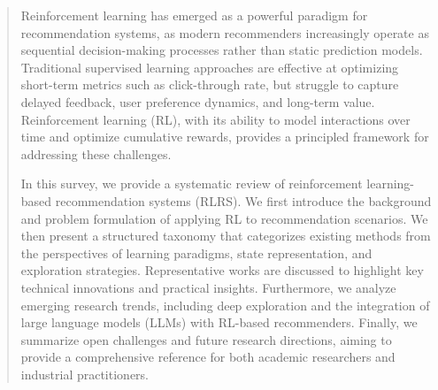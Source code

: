 \begin{abstract}

Reinforcement learning has emerged as a powerful paradigm for recommendation systems, as modern recommenders increasingly operate as sequential decision-making processes rather than static prediction models. Traditional supervised learning approaches are effective at optimizing short-term metrics such as click-through rate, but struggle to capture delayed feedback, user preference dynamics, and long-term value. Reinforcement learning (RL), with its ability to model interactions over time and optimize cumulative rewards, provides a principled framework for addressing these challenges.

In this survey, we provide a systematic review of reinforcement learning-based recommendation systems (RLRS). We first introduce the background and problem formulation of applying RL to recommendation scenarios. We then present a structured taxonomy that categorizes existing methods from the perspectives of learning paradigms, state representation, and exploration strategies. Representative works are discussed to highlight key technical innovations and practical insights. Furthermore, we analyze emerging research trends, including deep exploration and the integration of large language models (LLMs) with RL-based recommenders. Finally, we summarize open challenges and future research directions, aiming to provide a comprehensive reference for both academic researchers and industrial practitioners.
\end{abstract}
